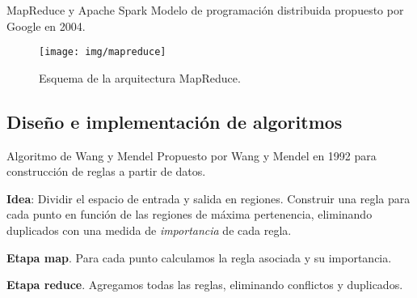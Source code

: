 \documentclass[10pt, spanish]{beamer}
\begin{document}
\begin{frame}{MapReduce y Apache Spark}
  Modelo de programación distribuida propuesto por Google en 2004.

  \begin{figure}
	\centering
	\texttt{[image: img/mapreduce]}
	\caption{\footnotesize Esquema de la arquitectura MapReduce.}
\end{figure}
\end{frame}

\subsection{Diseño e implementación de algoritmos}



\begin{frame}{Algoritmo de Wang y Mendel}
  Propuesto por Wang y Mendel en 1992 para construcción de reglas a partir de datos.

  \textbf{Idea}: Dividir el espacio de entrada y salida en regiones. Construir una regla para cada punto en función de las regiones de máxima pertenencia, eliminando duplicados con una medida de \textit{importancia} de cada regla.


  \textbf{Etapa map}. Para cada punto calculamos la regla asociada y su importancia.

  \textbf{Etapa reduce}. Agregamos todas las reglas, eliminando conflictos y duplicados.

\end{frame}
\end{document}

